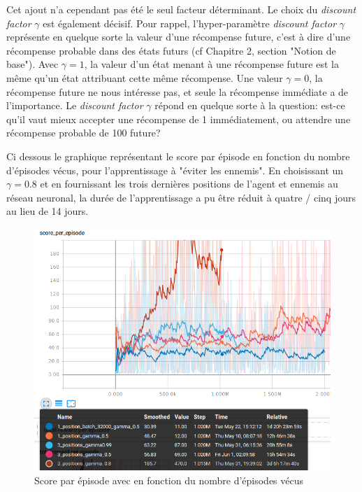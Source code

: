 \documentclass[11pt,a4paper]{report}
\begin{document}
   \par Cet ajout n'a cependant pas été le seul facteur déterminant. Le choix du \textit{discount factor} $\gamma$ est également décisif. Pour rappel, l'hyper-paramètre \textit{discount factor} $\gamma$ représente en quelque sorte la valeur d'une récompense future, c'est à dire d'une récompense probable dans des états futurs (cf Chapitre 2, section "Notion de base"). Avec $\gamma = 1$, la valeur d'un état menant à une récompense future est la même qu'un état attribuant cette même récompense. Une valeur $\gamma = 0$, la récompense future ne nous intéresse pas, et seule la récompense immédiate a de l'importance. Le \textit{discount factor} $\gamma$ répond en quelque sorte à la question: est-ce qu'il vaut mieux accepter une récompense de 1 immédiatement, ou attendre une récompense probable de 100 future? 
   
   \par Ci dessous le graphique représentant le score par épisode en fonction du nombre d'épisodes vécus, pour l'apprentissage à "éviter les ennemis". En choisissant un $\gamma = 0.8$ et en fournissant les trois dernières positions de l'agent et ennemis au réseau neuronal, la durée de l'apprentissage a pu être réduit à quatre / cinq jours au lieu de 14 jours. 
   
   \begin{figure}[!h]
   \center
   \includegraphics[scale=0.5]{ressources/input_size_gamma.png}
   \caption{Score par épisode avec en fonction du nombre d'épisodes vécus}
   \end{figure} 
   
\end{document}
